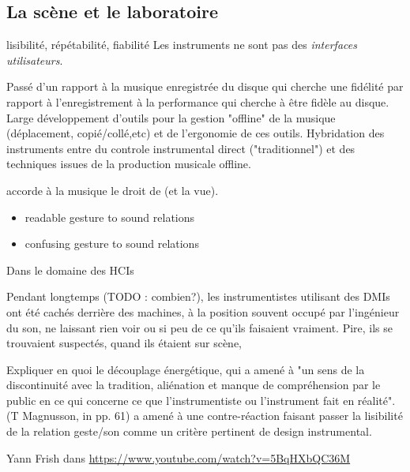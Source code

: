 \subsection{La scène et le laboratoire}
lisibilité, répétabilité, fiabilité
Les instruments ne sont pas des \textit{interfaces utilisateurs}.

Passé d'un rapport à la musique enregistrée du disque qui cherche une fidélité par rapport à l'enregistrement à la performance qui cherche à être fidèle au disque. \cite{??} 
Large développement d'outils pour la gestion "offline" de la musique (déplacement, copié/collé,etc) et de l'ergonomie de ces outils.
Hybridation des instruments entre du controle instrumental direct ("traditionnel") et des techniques issues de la production musicale offline.


accorde à la musique le droit de  (et la vue).



\vspace{-1em}
\begin{itemize}[noitemsep]
\item readable gesture to sound relations
\item confusing gesture to sound relations
\end{itemize}


Dans le domaine des \glspl{HCI} 

Pendant longtemps (TODO : combien?), les instrumentistes utilisant des \glspl{DMI} ont été cachés derrière des machines, à la position souvent occupé par l'ingénieur du son, ne laissant rien voir ou si peu de ce qu'ils faisaient vraiment. Pire, ils se trouvaient suspectés, quand ils étaient sur scène, 


Expliquer en quoi le découplage énergétique, qui a amené à "un sens de la discontinuité avec la tradition, aliénation et manque de compréhension par le public en ce qui concerne ce que l'instrumentiste ou l'instrument fait en réalité". (T Magnusson, in \cite{magnusson_sonic_2019} pp. 61) a amené à une contre-réaction faisant passer la lisibilité de la relation geste/son comme un critère pertinent de design instrumental.



 Yann Frish dans \url{https://www.youtube.com/watch?v=5BqHXbQC36M}


